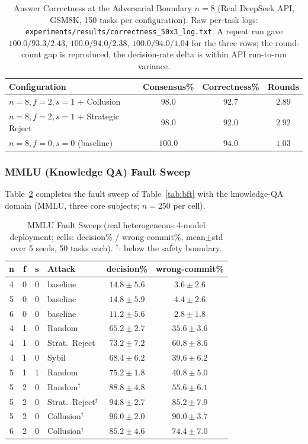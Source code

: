 \documentclass{article}
\begin{document}
\begin{table}[htbp]
\centering
\caption{Answer Correctness at the Adversarial Boundary $n{=}8$ (Real DeepSeek API, GSM8K, 150 tasks per configuration). Raw per-task logs: \texttt{experiments/results/correctness\_50x3\_log.txt}. A repeat run gave $100.0/93.3/2.43$, $100.0/94.0/2.38$, $100.0/94.0/1.04$ for the three rows; the round-count gap is reproduced, the decision-rate delta is within API run-to-run variance.}
\label{tab:n8_scaling}
\begin{tabular}{lccc}
\toprule
\textbf{Configuration} & \textbf{Consensus\%} & \textbf{Correctness\%} & \textbf{Rounds} \\
\midrule
$n{=}8, f{=}2, s{=}1$ + Collusion & $98.0$ & $92.7$ & $2.89$ \\
$n{=}8, f{=}2, s{=}1$ + Strategic Reject & $98.0$ & $92.0$ & $2.92$ \\
$n{=}8, f{=}0, s{=}0$ (baseline) & $100.0$ & $94.0$ & $1.03$ \\
\bottomrule
\end{tabular}
\end{table}

\subsubsection{MMLU (Knowledge QA) Fault Sweep}
Table~\ref{tab:mmlu_sweep} completes the fault sweep of Table~\ref{tab:bft} with the knowledge-QA domain (MMLU, three core subjects; $n{=}250$ per cell).

\begin{table}[htbp]
\centering
\caption{MMLU Fault Sweep (real heterogeneous 4-model deployment; cells: decision\% / wrong-commit\%, mean$\pm$std over 5 seeds, 50 tasks each). $^\dag$: below the safety boundary.}
\label{tab:mmlu_sweep}
\begin{tabular}{ccclcc}
\toprule
\textbf{n} & \textbf{f} & \textbf{s} & \textbf{Attack} & \textbf{decision\%} & \textbf{wrong-commit\%} \\
\midrule
4 & 0 & 0 & baseline & $14.8 \pm 5.6$ & $3.6 \pm 2.6$ \\
5 & 0 & 0 & baseline & $14.8 \pm 5.9$ & $4.4 \pm 2.6$ \\
6 & 0 & 0 & baseline & $11.2 \pm 5.6$ & $2.8 \pm 1.8$ \\
4 & 1 & 0 & Random & $65.2 \pm 2.7$ & $35.6 \pm 3.6$ \\
4 & 1 & 0 & Strat.\ Reject & $73.2 \pm 7.2$ & $60.8 \pm 8.6$ \\
4 & 1 & 0 & Sybil & $68.4 \pm 6.2$ & $39.6 \pm 6.2$ \\
5 & 1 & 1 & Random & $75.2 \pm 1.8$ & $40.8 \pm 5.0$ \\
5 & 2 & 0 & Random$^\dag$ & $88.8 \pm 4.8$ & $55.6 \pm 6.1$ \\
5 & 2 & 0 & Strat.\ Reject$^\dag$ & $94.8 \pm 2.7$ & $85.2 \pm 7.9$ \\
5 & 2 & 0 & Collusion$^\dag$ & $96.0 \pm 2.0$ & $90.0 \pm 3.7$ \\
6 & 2 & 0 & Collusion$^\dag$ & $85.2 \pm 4.6$ & $74.4 \pm 7.0$ \\
\bottomrule
\end{tabular}
\end{table}
\end{document}
